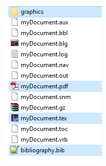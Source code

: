 \begin{frame}
\begin{minipage}{.58\textwidth}
\end{minipage}
%
\begin{minipage}{.40\textwidth}
	\centering
	\includegraphics[width=.9\linewidth]{../../texfiles-beamer/tex-material/WissArb-latex/latexDateien}
	
\end{minipage}

\end{frame}



